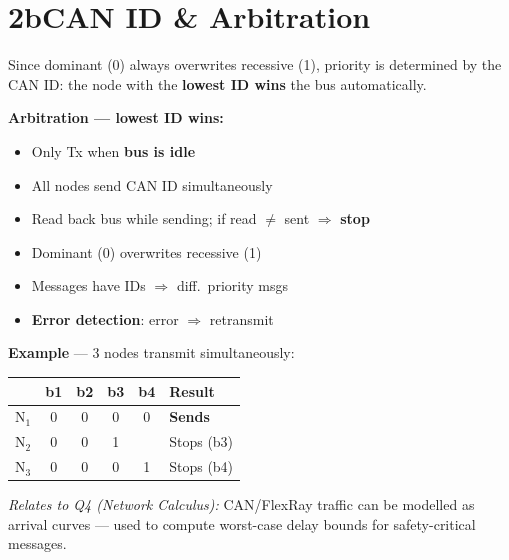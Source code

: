 \documentclass[10pt,a4paper]{article}
\begin{document}
\section*{2b\quad CAN ID \& Arbitration}
Since dominant (0) always overwrites recessive (1), priority is determined by the CAN ID: the node with the \textbf{lowest ID wins} the bus automatically.\\
\begin{minipage}[t]{0.46\textwidth}
\begin{keybox}
\textbf{Arbitration --- lowest ID wins:}
\begin{itemize}
  \item Only Tx when \textbf{bus is idle}
  \item All nodes send CAN ID simultaneously
  \item Read back bus while sending; if read $\neq$ sent $\Rightarrow$ \textbf{stop}
  \item Dominant (0) overwrites recessive (1)
  \item Messages have IDs $\Rightarrow$ diff.\ priority msgs
  \item \textbf{Error detection}: error $\Rightarrow$ retransmit
\end{itemize}
\end{keybox}
\end{minipage}\hfill
\begin{minipage}[t]{0.50\textwidth}

\vspace{4pt}
\textbf{Example} --- 3 nodes transmit simultaneously:

\vspace{2pt}
\begin{tabular}{@{}l|cccc|l@{}}
\toprule
      & b1 & b2 & b3 & b4 & Result \\\midrule
N$_1$ & 0  & 0  & 0  & 0  & \textcolor{defgreen}{\textbf{Sends}} \\
N$_2$ & 0  & 0  & 1  &    & \textcolor{warnred}{Stops (b3)} \\
N$_3$ & 0  & 0  & 0  & 1  & \textcolor{warnred}{Stops (b4)} \\\bottomrule
\end{tabular}

\vspace{4pt}
\begin{notebox}
\small\textit{Relates to Q4 (Network Calculus):} CAN/FlexRay
traffic can be modelled as arrival curves --- used to
compute worst-case delay bounds for safety-critical messages.
\end{notebox}
\end{minipage}
\end{document}
